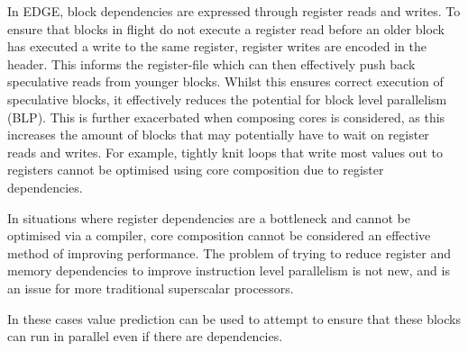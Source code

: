 In EDGE, block dependencies are expressed through register reads and writes.
To ensure that blocks in flight do not execute a register read before an older block has executed a write to the same register, register writes are encoded in the header.
This informs the register-file which can then effectively push back speculative reads from younger blocks.
Whilst this ensures correct execution of speculative blocks, it effectively reduces the potential for block level parallelism (BLP).
This is further exacerbated when composing cores is considered, as this increases the amount of blocks that may potentially have to wait on register reads and writes.
For example, tightly knit loops that write most values out to registers cannot be optimised using core composition due to register dependencies.

In situations where register dependencies are a bottleneck and cannot be optimised via a compiler, core composition cannot be considered an effective method of improving performance.
The problem of trying to reduce register and memory dependencies to improve instruction level parallelism is not new, and is an issue for more traditional superscalar processors.


In these cases value prediction can be used to attempt to ensure that these blocks can run in parallel even if there are dependencies.
